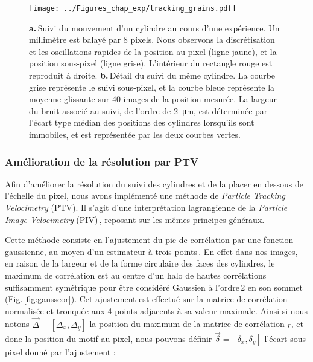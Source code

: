 \begin{figure}[p]
\centering	
\texttt{[image: ../Figures\_chap\_exp/tracking\_grains.pdf]}
\caption[Suivi du mouvement d'un grain]{\textbf{a.}\,Suivi du mouvement d'un cylindre au cours d'une expérience. Un millimètre est balayé par 8 pixels. Nous observons la discrétisation et les oscillations rapides de la position au pixel (ligne jaune), et la position sous-pixel (ligne grise). L'intérieur du rectangle rouge est reproduit à droite. \textbf{b.}\,Détail du suivi du même cylindre. La courbe grise représente le suivi sous-pixel, et la courbe bleue représente la moyenne glissante sur 40 images de la position mesurée. La largeur du bruit associé au suivi, de l'ordre de \SI{2}{\micro\meter}, est déterminée par l'écart type médian des positions des cylindres lorsqu'ils sont immobiles, et est représentée par les deux courbes vertes.}
\label{fig:trackingres}
\end{figure}







\subsubsection{Amélioration de la résolution par PTV}



Afin d'améliorer la résolution du suivi des cylindres et de la placer en dessous de l'échelle du pixel, nous avons implémenté une méthode de \textit{Particle Tracking Velocimetry} (PTV). Il s'agit d'une interprétation lagrangienne de la \textit{Particle Image Velocimetry} (PIV)\,\cite{raffel_particle_2007}, reposant sur les mêmes principes généraux.

Cette méthode consiste en l'ajustement du pic de corrélation par une fonction gaussienne, au moyen d'un estimateur à trois points\,\cite{raffel_particle_2007}. En effet dans nos images, en raison de la largeur et de la forme circulaire des faces des cylindres, le maximum de corrélation est au centre d'un halo de hautes corrélations suffisamment symétrique pour être considéré Gaussien à l'ordre\,2 en son sommet (Fig.\,\ref{fig:gausscor}). Cet ajustement est effectué sur la matrice de corrélation normalisée et tronquée aux 4 points adjacents à sa valeur maximale. Ainsi si nous notons $\vec{\Delta} = \left[\Delta_x,\Delta_y\right]$ la position du maximum de la matrice de corrélation $r$, et donc la position du motif au pixel, nous pouvons définir $\vec{\delta}=\left[\delta_x,\delta_y\right]$ l'écart sous-pixel donné par l'ajustement :

